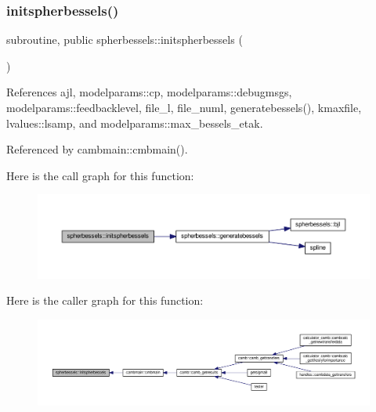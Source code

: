 \subsubsection{\texorpdfstring{initspherbessels()}{initspherbessels()}}
{\footnotesize\ttfamily subroutine, public spherbessels\+::initspherbessels (\begin{DoxyParamCaption}{ }\end{DoxyParamCaption})}



References ajl, modelparams\+::cp, modelparams\+::debugmsgs, modelparams\+::feedbacklevel, file\+\_\+l, file\+\_\+numl, generatebessels(), kmaxfile, lvalues\+::lsamp, and modelparams\+::max\+\_\+bessels\+\_\+etak.



Referenced by cambmain\+::cmbmain().

Here is the call graph for this function\+:
\nopagebreak
\begin{figure}[H]
\begin{center}
\leavevmode
\includegraphics[width=350pt]{namespacespherbessels_ab479fd257b8fa714e8a3522ab65e11af_cgraph}
\end{center}
\end{figure}
Here is the caller graph for this function\+:
\nopagebreak
\begin{figure}[H]
\begin{center}
\leavevmode
\includegraphics[width=350pt]{namespacespherbessels_ab479fd257b8fa714e8a3522ab65e11af_icgraph}
\end{center}
\end{figure}
\mbox{\label{namespacespherbessels_a193e3d6761bf168624e2532123ccec2b}} 
